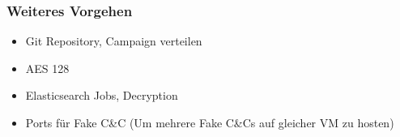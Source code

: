 \documentclass[class=scrbook,crop=false]{standalone}
\begin{document}
	\subsubsection*{Weiteres Vorgehen}
	\begin{itemize}
		\item Git Repository, Campaign verteilen
		\item AES 128
		\item Elasticsearch Jobs, Decryption
		\item Ports für Fake C&C (Um mehrere Fake C&Cs auf gleicher VM zu hosten)
	\end{itemize}
\end{document}
